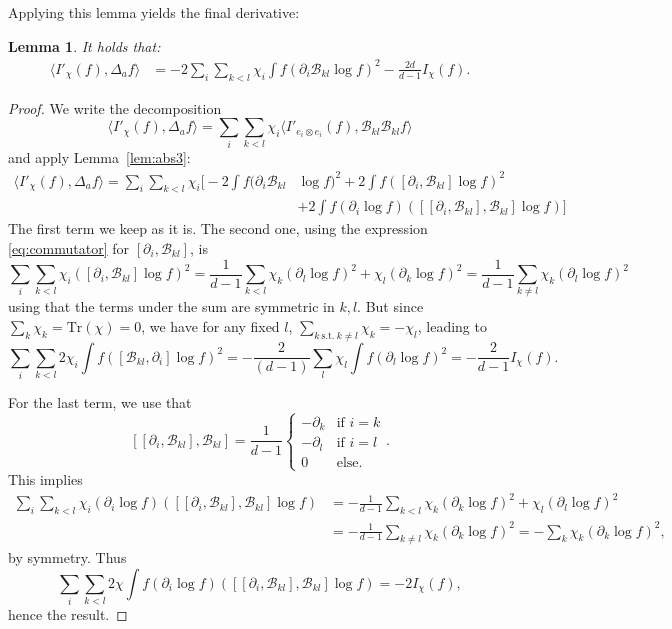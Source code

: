 \documentclass[11pt,a4paper]{article}
\theoremstyle{definition}
\theoremstyle{plain}
\newtheorem{lemma}[defi]{Lemma}
\newcommand{\jap}[1]{\langle #1 \rangle}
\begin{document}
Applying this lemma yields the final derivative:
\begin{lemma}
\label{lem:badterms}
    It holds that:
    \begin{align}
    \label{eq:I'chi,a}
        \jap{I'_{\chi}(f),\Delta_a f}&=-2\sum_i\!\sum_{k<l}\chi_i \int f(\partial_i \mathcal{B}_{kl}\log f)^2 -\frac{2d}{d-1}I_\chi(f).
    \end{align}
\end{lemma}
\begin{proof}
    We write the decomposition
    $$ \jap{I'_\chi(f),\Delta_a f} = \sum_i \sum_{k<l} \chi_i \jap{I'_{e_i\otimes e_i}(f),\mathcal{B}_{kl}\mathcal{B}_{kl}f}$$
    and apply Lemma~\ref{lem:abs3}:
    \begin{align*}
         \jap{I'_\chi(f),\Delta_a f} = \sum_i \sum_{k<l} \chi_i\bigg[-2\int f(\partial_i \mathcal{B}_{kl}&\log f)^2+2\int f ([\partial_i,\mathcal{B}_{kl}]\log f)^2\\
         &+2\int f(\partial_i\log f)([[\partial_i,\mathcal{B}_{kl}],\mathcal{B}_{kl}]\log f)\bigg]
    \end{align*}
    The first term we keep as it is. The second one, using the expression \eqref{eq:commutator} for $[\partial_i,\mathcal{B}_{kl}]$, is
    $$\sum_i\sum_{k<l}\chi_i([\partial_i,\mathcal{B}_{kl}]\log f)^2 = \frac{1}{d-1}\sum_{k<l}\chi_k (\partial_l\log f)^2+\chi_l (\partial_k\log f)^2= \frac{1}{d-1}\sum_{k\neq l}\chi_k (\partial_l\log f)^2$$
    using that the terms under the sum are symmetric in $k,l$.
    But since $\sum_k \chi_k = \text{Tr}(\chi)= 0$, we have for any fixed $l$, $\sum_{k\  \text{s.t.}\ k\neq l} \chi_k=-\chi_l$, leading to
    $$ \sum_i\sum_{k<l}2\chi_i\int f ([\mathcal{B}_{kl},\partial_i ]\log f)^2=-\frac{2}{(d-1)}\sum_{l}\chi_l \int f(\partial_l\log f)^2=-\frac{2}{d-1} I_\chi(f).$$
    
    For the last term, we use that
    $$[[\partial_i,\mathcal{B}_{kl}],\mathcal{B}_{kl}]=\frac{1}{d-1}\begin{cases}
        -\partial_k & \text{if }i=k \\
        -\partial_l & \text{if }i=l \\
        0 & \text{else.}\end{cases} .$$
    This implies
    \begin{align*}
        \sum_i\sum_{k<l} \chi_i(\partial_i \log f) ([[\partial_i,\mathcal{B}_{kl}],\mathcal{B}_{kl}]\log f)&=-\frac{1}{d-1}\sum_{k<l}\chi_k(\partial_k \log f)^2+\chi_l(\partial_l \log f)^2 \\
        &= -\frac{1}{d-1}\sum_{k\neq l}\chi_k(\partial_k \log f)^2=-\sum_k \chi_k(\partial_k \log f)^2,
    \end{align*}
    by symmetry. Thus
    $$\sum_i \sum_{k<l}2\chi\int f(\partial_i\log f)([[\partial_i,\mathcal{B}_{kl}],\mathcal{B}_{kl}]\log f)=-2I_\chi(f),$$
    hence the result.
\end{proof}
\end{document}
